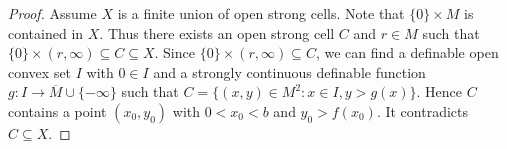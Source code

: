 \documentclass{amsart}
\theoremstyle{definition}
\theoremstyle{plain}
\newtheorem{theorem}[definition]{Theorem}
\newtheorem{df}[definition]{Definition}
\newcommand{\ov}[1]{\overline{#1}}
\begin{document}
\begin{proof}
Assume $X$ is a finite union of open strong cells.
Note that $\{ 0 \} \times M$ is contained in $X$.
Thus there exists an open strong cell $C$ and $r \in M$ such that 
$\{0\} \times (r, \infty) \subseteq C \subseteq X$.
Since $\{0\} \times (r,  \infty) \subseteq C$,
we can find a definable open convex set $I$ with $0 \in I$ and a strongly continuous definable function $g:I \to \overline{M} \cup \{-\infty\}$
such that 
$C=\{ (x, y) \in M^2 : x \in I, y>g(x)\}$.
Hence $C$ contains a point $(x_0, y_0)$ with $0<x_0<b$ and $y_0>f(x_0)$.
It contradicts $C \subseteq X$.
\end{proof}


%
%
%
%
%
%
%
%
%
%
%
%
%
\end{document}
